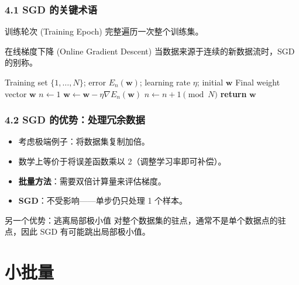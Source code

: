 \documentclass[t,aspectratio=169]{beamer} %
\begin{document}
\begin{frame}[allowframebreaks]
    \frametitle{4.1 SGD 的关键术语}
    \begin{block}{训练轮次 (Training Epoch)}
        完整遍历一次整个训练集。
    \end{block}
    \begin{block}{在线梯度下降 (Online Gradient Descent)}
        当数据来源于连续的新数据流时，SGD 的别称。
    \end{block}
    \vspace{0.5em}
    \begin{algorithm}[H]
    \caption{Stochastic gradient descent}
    \begin{algorithmic}
    \Input Training set $\{1,\dots,N\}$; error $E_n(\mathbf{w})$; learning rate $\eta$; initial $\mathbf{w}$
    \Output Final weight vector $\mathbf{w}$
    \State $n \leftarrow 1$
    \Repeat
      \State $\mathbf{w} \leftarrow \mathbf{w} - \eta \nabla E_n(\mathbf{w})$ 
      \State $n \leftarrow n + 1 \pmod{N}$ 
    \State \textbf{return} $\mathbf{w}$
    \end{algorithmic}
    \end{algorithm}
\end{frame}

\begin{frame}
    \frametitle{4.2 SGD 的优势：处理冗余数据}
    \begin{itemize}
        \item 考虑极端例子：将数据集\alert{复制加倍}。
        \item 数学上等价于将误差函数乘以 2（调整学习率即可补偿）。
        \item \textbf{批量方法}：需要\alert{双倍计算量}来评估梯度。
        \item \textbf{SGD}：\alert{不受影响}——单步仍只处理 1 个样本。
    \end{itemize}
    \begin{block}{另一个优势：逃离局部极小值}
        对整个数据集的驻点，通常\alert{不是}单个数据点的驻点，因此 SGD 有可能跳出局部极小值。
    \end{block}
\end{frame}

\section{小批量}
\end{document}
